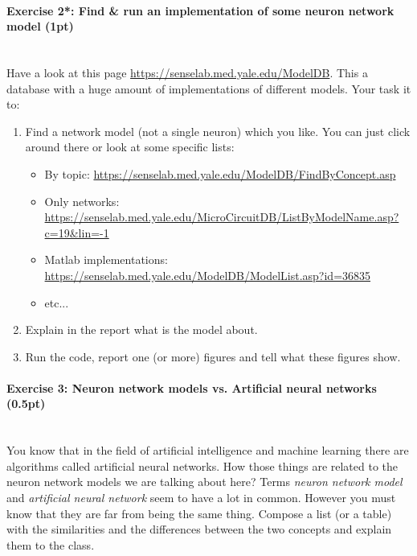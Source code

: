 \documentclass[a4paper,11pt]{article}
\newenvironment{exercise}[3]{\paragraph{Exercise #1: #2 (#3pt)}\ \\}{
\medskip}
\begin{document}
%
%
\begin{exercise}{2*}{Find \& run an implementation of some neuron network model}{1}
Have a look at this page \url{https://senselab.med.yale.edu/ModelDB}. This a database with a huge amount of implementations of different models. Your task it to:
\begin{enumerate}[label=\alph*)]
	\item Find a network model (not a single neuron) which you like. You can just click around there or look at some specific lists:
		\begin{itemize}
			\item By topic: \url{https://senselab.med.yale.edu/ModelDB/FindByConcept.asp}
			\item Only networks: \url{https://senselab.med.yale.edu/MicroCircuitDB/ListByModelName.asp?c=19&lin=-1}
			\item Matlab implementations: \url{https://senselab.med.yale.edu/ModelDB/ModelList.asp?id=36835}
			\item etc...
		\end{itemize}
	\item Explain in the report what is the model about.
	\item Run the code, report one (or more) figures and tell what these figures show.
\end{enumerate}
\end{exercise}


%
%
\begin{exercise}{3}{Neuron network models vs. Artificial neural networks}{0.5}
You know that in the field of artificial intelligence and machine learning there are algorithms called artificial neural networks. How those things are related to the neuron network models we are talking about here? Terms \emph{neuron network model} and \emph{artificial neural network} seem to have a lot in common. However you must know that they are far from being the same thing. Compose a list (or a table) with the similarities and the differences between the two concepts and explain them to the class.
\end{exercise}
\end{document}
